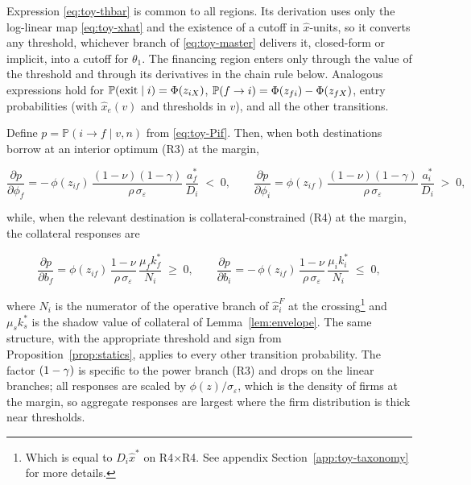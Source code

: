 \documentclass[12pt]{article}
\begin{document}
Expression \eqref{eq:toy-thbar} is common to all regions. Its derivation uses only the log-linear map \eqref{eq:toy-xhat} and the existence of a cutoff in $\hat x$-units, so it converts any threshold, whichever branch of \eqref{eq:toy-master} delivers it, closed-form or implicit, into a cutoff for $\theta_{1}$. The financing region enters only through the value of the threshold and through its derivatives in the chain rule below. Analogous expressions hold for $\mathbb{P}(\text{exit}\mid i)=\Phi(z_{i X})$, $\mathbb{P}(f\to i)=\Phi(z_{fi})-\Phi(z_{f X})$, entry probabilities (with $\hat x_{e}(v)$ and thresholds in $v$), and all the other transitions.
 
\begin{proposition}
\label{prop:semielast}
Define $p=\mathbb{P}(i\to f \mid v,n)$ from \eqref{eq:toy-Pif}. Then, when both destinations borrow at an interior optimum (R3) at the margin,

\begin{equation}
  \frac{\partial p}{\partial \phi_{f}}
  = -\,\phi(z_{if})\,
     \frac{(1-\nu)(1-\gamma)}{\rho\,\sigma_{\varepsilon}}\,
     \frac{a^{*}_{f}}{D_{i}} \;<\;0,
  \qquad
  \frac{\partial p}{\partial \phi_{i}}
  = \phi(z_{if})\,
     \frac{(1-\nu)(1-\gamma)}{\rho\,\sigma_{\varepsilon}}\,
     \frac{a^{*}_{i}}{D_{i}} \;>\;0,
  \label{eq:toy-dpdphi}
\end{equation}

while, when the relevant destination is collateral-constrained (R4) at the margin, the collateral responses are

\begin{equation}
  \frac{\partial p}{\partial b_{f}}
  = \phi(z_{if})\,
     \frac{1-\nu}{\rho\,\sigma_{\varepsilon}}\,
     \frac{\mu_{f}k^{*}_{f}}{N_{i}} \;\geq\;0,
  \qquad
  \frac{\partial p}{\partial b_{i}}
  = -\,\phi(z_{if})\,
     \frac{1-\nu}{\rho\,\sigma_{\varepsilon}}\,
     \frac{\mu_{i}k^{*}_{i}}{N_{i}} \;\leq\;0,
  \label{eq:toy-dpdb}
\end{equation}

where $N_{i}$ is the numerator of the operative branch of $\hat x^F_{i}$ at the crossing\footnote{Which is equal to $D_{i}\hat x^{*}$ on R4$\times$R4. See appendix Section~\ref{app:toy-taxonomy} for more details.} and $\mu_{s}k^{*}_{s}$ is the shadow value of collateral of Lemma~\ref{lem:envelope}. The same structure, with the appropriate threshold and sign from Proposition~\ref{prop:statics}, applies to every other transition probability. The factor $(1-\gamma)$ is specific to the power branch (R3) and drops on the linear branches; all responses are scaled by $\phi(z)/\sigma_{\varepsilon}$, which is the density of firms at the margin, so aggregate responses are largest where the firm distribution is thick near thresholds.
\end{proposition}
 
\end{document}
